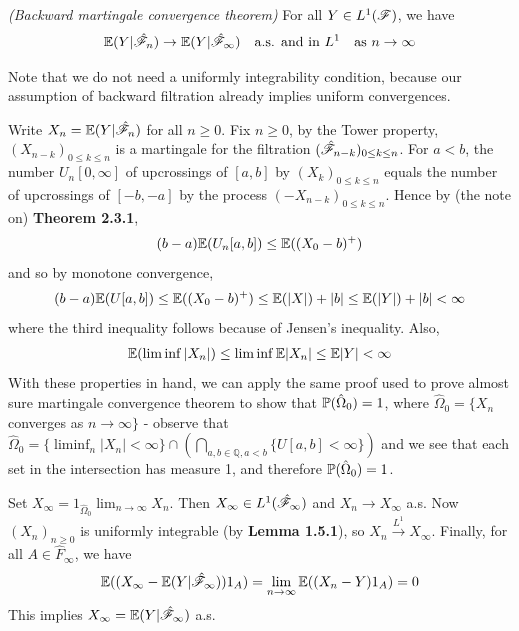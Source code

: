 \documentclass[10pt,a4paper]{report}
\newenvironment{proof}
{\begin{changemargin}{1cm}{0.5cm} 
	}%
	{\end{changemargin}
}
\begin{document}
 \emph{(Backward martingale convergence theorem)} For all $Y\in L^1(\mathscr{F})$, we have 
\begin{align*}
\mathbb{E}(Y|\hat{\mathscr{F}}_n) \rightarrow \mathbb{E}(Y|\hat{\mathscr{F}}_{\infty}) \quad \text{a.s. and in } L^1 \quad \text{as } n\rightarrow \infty
\end{align*}
\s

Note that we do not need a uniformly integrability condition, because our assumption of backward filtration already implies uniform convergences.
\begin{proof}
\pf Write $X_n = \mathbb{E}(Y|\hat{\mathscr{F}}_n)$ for all $n\geq 0$. Fix $n\geq 0$, by the Tower property, $(X_{n-k})_{0\leq k\leq n}$ is a martingale for the filtration $(\hat{\mathscr{F}}_{n-k})_{0\leq k\leq n}$. For $a<b$, the number $U_n[0,\infty]$ of upcrossings of $[a,b]$ by $(X_k)_{0\leq k \leq n}$ equals the number of upcrossings of $[-b,-a]$ by the process $(-X_{n-k})_{0\leq k\leq n}$. Hence by (the note on) \textbf{Theorem 2.3.1},
\begin{align*}
(b-a)\mathbb{E}(U_n [a,b]) \leq \mathbb{E}((X_0 -b)^+)
\end{align*}
and so by monotone convergence,
\begin{align*}
(b-a) \mathbb{E}(U[a,b]) \leq \mathbb{E}((X_0-b)^+) \leq \mathbb{E}(|X|) + |b| \leq \mathbb{E}(|Y|) + |b| <\infty
\end{align*}
where the third inequality follows because of Jensen's inequality. Also, 
\begin{align*}
\mathbb{E}(\liminf |X_n|) \leq \liminf \mathbb{E}|X_n| \leq \mathbb{E}|Y| < \infty
\end{align*}
With these properties in hand, we can apply the same proof used to prove almost sure martingale convergence theorem to show that $\mathbb{P}(\hat{\Omega}_0)=1$, where $\hat{\Omega}_0 = \{X_n$ converges as $n\rightarrow \infty \}$ - observe that $\hat{\Omega}_0 = \{\liminf_n |X_n| < \infty\} \cap (\bigcap_{a,b\in \mathbb{Q},a<b} \{ U[a,b]<\infty  \} )$ and we see that each set in the intersection has measure 1, and therefore $\mathbb{P}(\hat{\Omega}_0)=1$.

\quad Set $X_{\infty} = 1_{\hat{\Omega}_0} \lim_{n\rightarrow \infty} X_n$. Then $X_{\infty} \in L^1(\hat{\mathscr{F}}_{\infty})$ and $X_n \rightarrow X_{\infty}$ a.s. Now $(X_n)_{n\geq 0}$ is uniformly integrable (by \textbf{Lemma 1.5.1}), so $X_n\xrightarrow{L^1} X_{\infty}$. Finally, for all $A\in \hat{F}_{\infty}$, we have
\begin{align*}
\mathbb{E}((X_{\infty} - \mathbb{E}(Y|\hat{\mathscr{F}}_{\infty})) 1_A) = \lim_{n\rightarrow \infty} \mathbb{E}((X_n -Y)1_A) = 0
\end{align*}
This implies $X_{\infty} = \mathbb{E}(Y|\hat{\mathscr{F}}_{\infty})$ a.s.

\eop
\end{proof}
\end{document}
